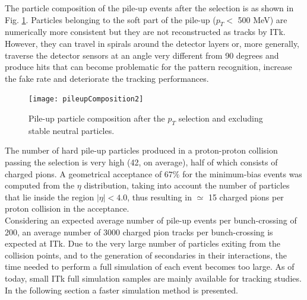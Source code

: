 \documentclass[a4paper,twoside,12pt]{book}
\begin{document}
The particle composition of the pile-up events after the selection is as shown in Fig.
\ref{fig:pileupComposition}. Particles belonging to the soft part of the pile-up ($p_{T} <$ 500 MeV) are numerically more consistent but 
they are not reconstructed as tracks by ITk. However, they can travel in spirals around the 
detector layers or, more generally, traverse the detector sensors at an angle very different
from 90 degrees and produce hits that can become problematic for the pattern recognition, increase the fake rate and deteriorate the tracking
performances. \\

\begin{figure} [h]
	\texttt{[image: pileupComposition2]}
	\caption{Pile-up particle composition after the $p_{T}$ selection and excluding stable neutral particles.}
	\label{fig:pileupComposition}
\end{figure}

The number of hard pile-up particles produced in a proton-proton collision passing the selection is very high (42, on average), 
half of which consists of charged pions. A geometrical acceptance of $67\%$ for the minimum-bias events was computed from the $\eta$ distribution, taking into account the number of particles that 
lie inside the region $|\eta| < 4.0$, thus resulting in $\simeq$ 15 charged pions per proton collision in 
the acceptance.\\

Considering an expected average number of pile-up events per bunch-crossing of 200, an average number of 3000 charged pion tracks per bunch-crossing is expected at ITk.
Due to the very large number of particles exiting from the collision points, and to the generation of secondaries in their interactions, the time
needed to perform a full simulation of each event becomes too large.
As of today, small ITk full simulation samples are mainly available for tracking studies. In the following section a faster simulation method is presented.
\end{document}
